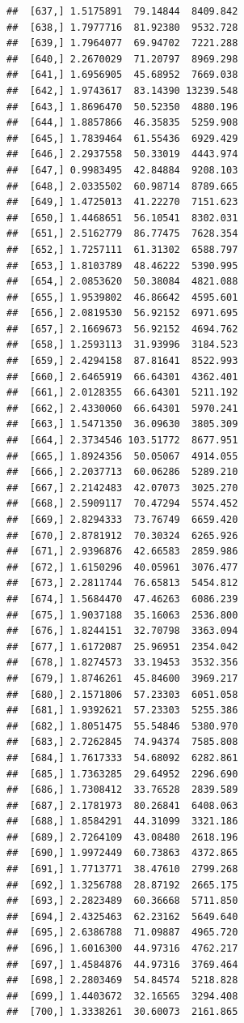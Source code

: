 \documentclass[article]{jss}\usepackage[]{graphicx}\usepackage[]{xcolor}
\makeatletter
\newenvironment{kframe}{%
 \def\at@end@of@kframe{}%
 \ifinner\ifhmode%
  \def\at@end@of@kframe{\end{minipage}}%
  \begin{minipage}{\columnwidth}%
 \fi\fi%
 \def\FrameCommand##1{\hskip\@totalleftmargin \hskip-\fboxsep
 \colorbox{shadecolor}{##1}\hskip-\fboxsep
     \hskip-\linewidth \hskip-\@totalleftmargin \hskip\columnwidth}%
 \MakeFramed {\advance\hsize-\width
   \@totalleftmargin\z@ \linewidth\hsize
   \@setminipage}}%
 {\par\unskip\endMakeFramed%
 \at@end@of@kframe}
\newenvironment{knitrout}{}{} %
\makeatother
\begin{document}
\begin{knitrout}
\begin{kframe}
\begin{verbatim}
##  [637,] 1.5175891  79.14844  8409.842
##  [638,] 1.7977716  81.92380  9532.728
##  [639,] 1.7964077  69.94702  7221.288
##  [640,] 2.2670029  71.20797  8969.298
##  [641,] 1.6956905  45.68952  7669.038
##  [642,] 1.9743617  83.14390 13239.548
##  [643,] 1.8696470  50.52350  4880.196
##  [644,] 1.8857866  46.35835  5259.908
##  [645,] 1.7839464  61.55436  6929.429
##  [646,] 2.2937558  50.33019  4443.974
##  [647,] 0.9983495  42.84884  9208.103
##  [648,] 2.0335502  60.98714  8789.665
##  [649,] 1.4725013  41.22270  7151.623
##  [650,] 1.4468651  56.10541  8302.031
##  [651,] 2.5162779  86.77475  7628.354
##  [652,] 1.7257111  61.31302  6588.797
##  [653,] 1.8103789  48.46222  5390.995
##  [654,] 2.0853620  50.38084  4821.088
##  [655,] 1.9539802  46.86642  4595.601
##  [656,] 2.0819530  56.92152  6971.695
##  [657,] 2.1669673  56.92152  4694.762
##  [658,] 1.2593113  31.93996  3184.523
##  [659,] 2.4294158  87.81641  8522.993
##  [660,] 2.6465919  66.64301  4362.401
##  [661,] 2.0128355  66.64301  5211.192
##  [662,] 2.4330060  66.64301  5970.241
##  [663,] 1.5471350  36.09630  3805.309
##  [664,] 2.3734546 103.51772  8677.951
##  [665,] 1.8924356  50.05067  4914.055
##  [666,] 2.2037713  60.06286  5289.210
##  [667,] 2.2142483  42.07073  3025.270
##  [668,] 2.5909117  70.47294  5574.452
##  [669,] 2.8294333  73.76749  6659.420
##  [670,] 2.8781912  70.30324  6265.926
##  [671,] 2.9396876  42.66583  2859.986
##  [672,] 1.6150296  40.05961  3076.477
##  [673,] 2.2811744  76.65813  5454.812
##  [674,] 1.5684470  47.46263  6086.239
##  [675,] 1.9037188  35.16063  2536.800
##  [676,] 1.8244151  32.70798  3363.094
##  [677,] 1.6172087  25.96951  2354.042
##  [678,] 1.8274573  33.19453  3532.356
##  [679,] 1.8746261  45.84600  3969.217
##  [680,] 2.1571806  57.23303  6051.058
##  [681,] 1.9392621  57.23303  5255.386
##  [682,] 1.8051475  55.54846  5380.970
##  [683,] 2.7262845  74.94374  7585.808
##  [684,] 1.7617333  54.68092  6282.861
##  [685,] 1.7363285  29.64952  2296.690
##  [686,] 1.7308412  33.76528  2839.589
##  [687,] 2.1781973  80.26841  6408.063
##  [688,] 1.8584291  44.31099  3321.186
##  [689,] 2.7264109  43.08480  2618.196
##  [690,] 1.9972449  60.73863  4372.865
##  [691,] 1.7713771  38.47610  2799.268
##  [692,] 1.3256788  28.87192  2665.175
##  [693,] 2.2823489  60.36668  5711.850
##  [694,] 2.4325463  62.23162  5649.640
##  [695,] 2.6386788  71.09887  4965.720
##  [696,] 1.6016300  44.97316  4762.217
##  [697,] 1.4584876  44.97316  3769.464
##  [698,] 2.2803469  54.84574  5218.828
##  [699,] 1.4403672  32.16565  3294.408
##  [700,] 1.3338261  30.60073  2161.865

\end{verbatim}
\end{kframe}
\end{knitrout}
\end{document}
